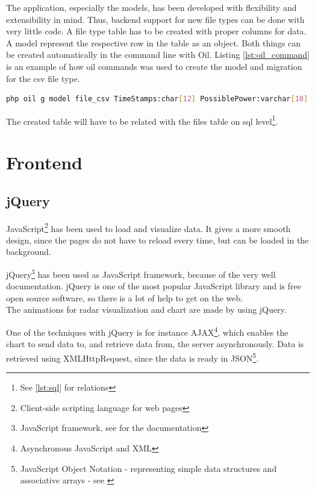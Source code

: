 The application, especially the models, has been developed with flexibility and extensibility in mind. Thus, backend support for new file types can be done with very little code. A file type table has to be created with proper columns for data. A \textsf{model} represent the respective row in the table as an object. Both things can be created automatically in the command line with Oil. Listing \ref{lst:oil_command} is an example of how oil commands was used to create the model and migration for the csv file type.
\begin{lstlisting}[language=sh,caption={Oil command for creating model and migration},label={lst:oil_command}]
php oil g model file_csv TimeStamps:char[12] PossiblePower:varchar[10] WindSpeed:varchar[10] RegimePossible:varchar[10] OutputPower:varchar[10] RegimeOutput:varchar[10] TimeStampsR:char[19] file_id:bigint
\end{lstlisting}

The created table will have to be related with the \textsf{files} table on sql level\footnote{See \ref{lst:sql} for relations}.

\section{Frontend}
\subsection{jQuery}
JavaScript\footnote{Client-side scripting language for web pages} has been used to load and visualize data. It gives a more smooth design, since the pages do not have to reload every time, but can be loaded in the background.

jQuery\footnote{JavaScript framework, see \cite{jquery} for the documentation} has been used as JavaScript framework, because of the very well documentation. jQuery is one of the most popular JavaScript library and is free open source software, so there is a lot of help to get on the web.\\
The animations for radar visualization and chart are made by using jQuery.
 
One of the techniques with jQuery is for instance AJAX\footnote{Asynchronous JavaScript and XML}, which enables the chart to send data to, and retrieve data from, the server asynchronously. Data is retrieved using XMLHttpRequest, since the data is ready in JSON\footnote{JavaScript Object Notation - representing simple data structures and associative arrays - see \cite{json}}.

